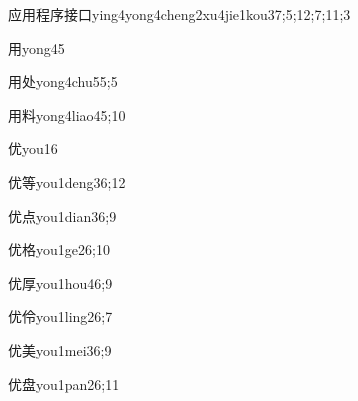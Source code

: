 \begin{verbete*}{应用程序接口}{ying4yong4cheng2xu4jie1kou3}{7;5;12;7;11;3}
\end{verbete*}

\begin{verbete}{用}{yong4}{5}
\end{verbete}

\begin{verbete}{用处}{yong4chu5}{5;5}
\end{verbete}

\begin{verbete}{用料}{yong4liao4}{5;10}
\end{verbete}

\begin{verbete}{优}{you1}{6}
\end{verbete}

\begin{verbete}{优等}{you1deng3}{6;12}
\end{verbete}

\begin{verbete}{优点}{you1dian3}{6;9}
\end{verbete}

\begin{verbete}{优格}{you1ge2}{6;10}
\end{verbete}

\begin{verbete}{优厚}{you1hou4}{6;9}
\end{verbete}

\begin{verbete}{优伶}{you1ling2}{6;7}
\end{verbete}

\begin{verbete}{优美}{you1mei3}{6;9}
\end{verbete}

\begin{verbete}{优盘}{you1pan2}{6;11}
\end{verbete}

